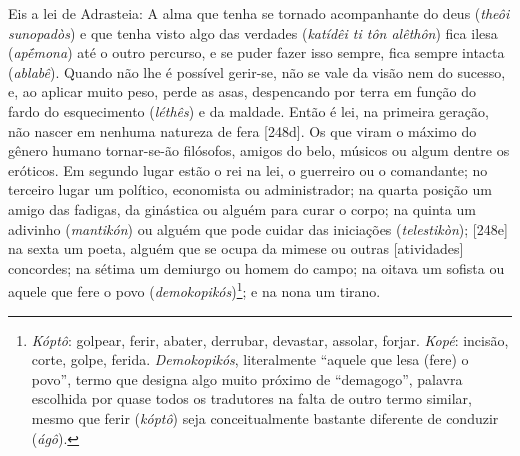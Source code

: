 Eis a lei de Adrasteia: A alma que tenha se tornado acompanhante do deus
(\emph{theôi sunopadòs}) e que tenha visto algo das verdades
(\emph{katídêi ti tôn alêthôn}) fica ilesa (\emph{apḗmona}) até o outro
percurso, e se puder fazer isso sempre, fica sempre intacta
(\emph{ablabê}). Quando não lhe é possível gerir-se, não se vale da
visão nem do sucesso, e, ao aplicar muito peso, perde as asas,
despencando por terra em função do fardo do esquecimento (\emph{léthês})
e da maldade. Então é lei, na primeira geração, não nascer em nenhuma
natureza de fera {[}248d{]}. Os que viram o máximo do gênero humano
tornar-se-ão filósofos, amigos do belo, músicos ou algum dentre os
eróticos. Em segundo lugar estão o rei na lei, o guerreiro ou o
comandante; no terceiro lugar um político, economista ou administrador;
na quarta posição um amigo das fadigas, da ginástica ou alguém para
curar o corpo; na quinta um adivinho (\emph{mantikón}) ou alguém que
pode cuidar das iniciações (\emph{telestikòn}); {[}248e{]} na sexta um
poeta, alguém que se ocupa da mimese ou outras {[}atividades{]}
concordes; na sétima um demiurgo ou homem do campo; na oitava um sofista
ou aquele que fere o povo (\emph{demokopikós})\footnote{\emph{Kóptô}:
  golpear, ferir, abater, derrubar, devastar, assolar, forjar.
  \emph{Kopé}: incisão, corte, golpe, ferida. \emph{Demokopikós},
  literalmente ``aquele que lesa (fere) o povo'', termo que designa algo
  muito próximo de ``demagogo'', palavra escolhida por quase todos os
  tradutores na falta de outro termo similar, mesmo que ferir
  (\emph{kóptô}) seja conceitualmente bastante diferente de conduzir
  (\emph{ágô}).}; e na nona um tirano.

